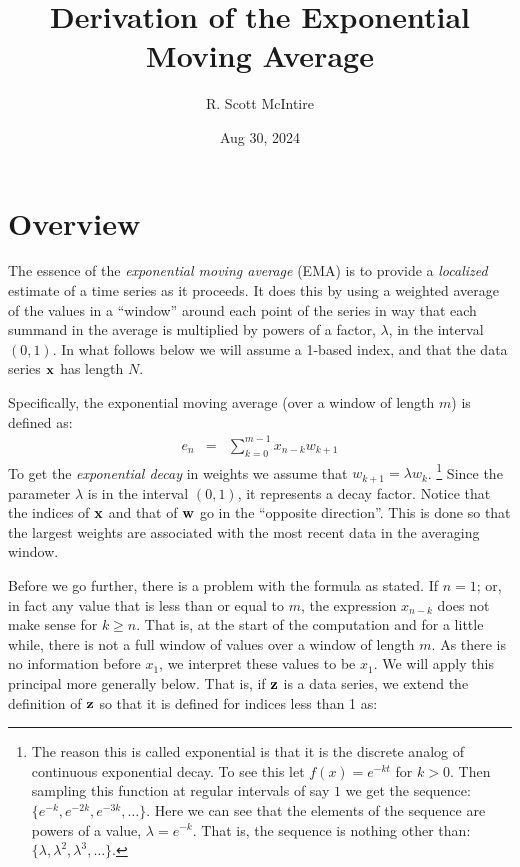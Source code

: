 \documentclass{article}
\title{Derivation of the Exponential Moving Average}
\author{R. Scott McIntire}
\date{Aug 30, 2024}
\begin{document}

\maketitle

\section{Overview}

The essence of the {\em exponential moving average\/} (EMA) is to provide 
a {\em localized\/} estimate of a time series as it proceeds. It does 
this by using a weighted average of the values in a ``window'' around each point 
of the series in way that each summand in 
the average is multiplied by powers of a factor, $\lambda$,
in the interval $(0,1)$.
In what follows below we will assume a 1-based index, and that 
the data series ${\bf x}$ has length $N$.

Specifically, the exponential moving average (over a window of length $m$) 
is defined as:
\begin{eqnarray}
    e_n &=& \sum_{k=0}^{m-1} x_{n-k} w_{k+1}  \label{ema_def}
\end{eqnarray}
To get the {\em exponential decay\/} in weights we assume that $w_{k+1} = \lambda w_k$.%
\footnote{The reason this is called exponential is that it is the discrete
analog of continuous exponential decay. To see this let $f(x) = e^{-kt}$ 
for $k > 0$. Then sampling this function at regular intervals of say $1$ 
we get the sequence: $\{ e^{-k}, e^{-2k}, e^{-3k}, \ldots \}$.
Here we can see that the elements of the sequence are powers of a value, $\lambda = e^{-k}$.
That is, the sequence is nothing other than: $\{\lambda, \lambda^2, \lambda^3, \ldots \}$.}
Since the parameter $\lambda$ is in the interval $(0,1)$, it represents a decay factor. 
Notice that the indices of ${\bf x}$ and that of ${\bf w}$ go in the ``opposite direction''.
This is done so that the largest weights are associated with the most recent data
in the averaging window.

Before we go further, there is a problem with the formula as stated.
If $n = 1$; or, in fact any value that is less than or equal to $m$,
the expression $x_{n-k}$ does not make sense for $k \ge n$. That is, at the 
start of the computation and for a little while, there is not a full window
of values over a window of length $m$. As there is no information before $x_1$,
we interpret these values to be $x_1$. 
We will apply this principal more generally below. 
That is, if ${\bf z}$ is a data series,
we extend the definition of ${\bf z}$ so that it is defined for
indices less than 1 as:
\end{document}

